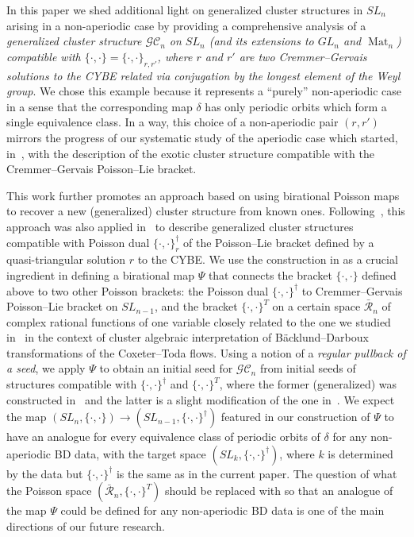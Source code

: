 \documentclass{amsart}
\theoremstyle{definition}
\theoremstyle{remark}
\numberwithin{equation}{section}
\numberwithin{theorem}{section}
\def\CC{{\mathcal C}}
\def\G{{\mathcal G}}
\def\RR{{\mathcal R}}
\def\Mat{\operatorname{Mat}}
\def\Poi{{\{{\cdot},{\cdot}\}}}
\begin{document}
In this paper we shed additional light on generalized cluster structures in $SL_n$ arising in a non-aperiodic case by providing a comprehensive analysis of a {\em generalized cluster structure $\G\CC_n$ on $SL_n$ (and its extensions to $GL_n$ and $\Mat_n$)
compatible with $\Poi=\Poi_{r,r'}$, where $r$ and $r'$ are two Cremmer--Gervais solutions to the CYBE related  via conjugation by the longest element of the Weyl group}. 
We chose this example because it represents a ``purely'' non-aperiodic case in a sense that the corresponding map $\delta$ has only periodic orbits which form a single equivalence class.  In a way, this choice of a non-aperiodic pair $(r,r')$ mirrors the progress of our systematic study of the aperiodic case which started, in~\cite{GSVPNAS, GSVMem}, with the description of the exotic cluster structure compatible with the Cremmer--Gervais Poisson--Lie bracket.


This work further promotes an approach based on using birational Poisson maps to recover a new (generalized) cluster structure from known ones. 
Following~\cite{GSVuni}, this approach was also applied in~\cite{GV} to describe generalized cluster structures compatible with Poisson dual $\Poi^\dag_r$ of the Poisson--Lie bracket defined by a quasi-triangular solution $r$ to the CYBE. We use the construction in \cite{GV} as a crucial ingredient in defining a birational map $\Psi$ that connects the bracket $\Poi$ defined above to two other Poisson brackets: the Poisson dual  $\Poi^\dag$ to Cremmer--Gervais Poisson--Lie bracket on $SL_{n-1}$, 
and the bracket $\Poi^T$ on a certain space $\bar\RR_n$ of complex rational functions of one variable closely related to the one we studied in~\cite{GSV_Acta} in the context of cluster algebraic interpretation of B\"acklund--Darboux transformations of the Coxeter--Toda flows. Using a notion of a {\em regular pullback of a seed\/}, we apply  $\Psi$ to obtain an initial 
seed for $\G\CC_n$
from initial seeds of structures compatible with $\Poi^\dag$ and $\Poi^T$, where the former (generalized) was constructed 
in~\cite{GV} and the latter is a slight modification of the one in~\cite{GSV_Acta}.  We expect the map 
$(SL_n,\Poi) \to (SL_{n-1},\Poi^\dag)$ featured in our construction of $\Psi$ to have an analogue for every equivalence class of periodic orbits of $\delta$ for any non-aperiodic BD data, with the target space  $(SL_{k},\Poi^\dag)$, where $k$ is determined by the data but 
$\Poi^\dag$ is the same as in the current paper. The question of what the Poisson space $(\bar\RR_n, \Poi^T)$ should be replaced with so that an analogue of the map $\Psi$ could be defined for any non-aperiodic BD data is one of the main directions of our future research.
\end{document}
